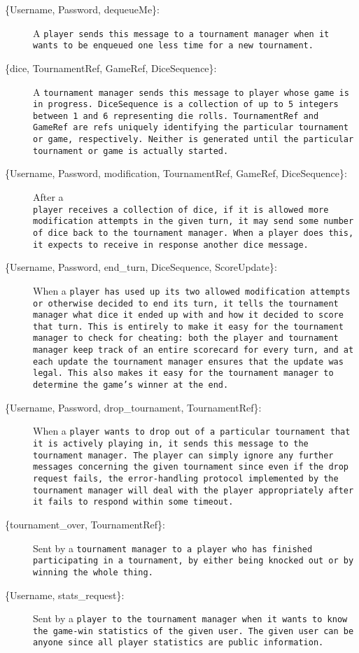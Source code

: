 \documentclass[12pt,letterpaper]{article}
\newcommand{\tm}{\tt{tournament manager}}
\newcommand{\pl}{\tt{player}}
\begin{document}
\begin{description}
\item[\{Username, Password, dequeueMe\}:] A \pl{} sends this message to a \tm{} when it wants to be enqueued one less time for a new tournament.

\item[\{dice, TournamentRef, GameRef, DiceSequence\}:] A \tm{} sends this message to \pl{} whose game is in progress.  \tt{DiceSequence} is a collection of up to 5 integers between 1 and 6 representing die rolls.  \tt{TournamentRef} and \tt{GameRef} are \tt{ref}s uniquely identifying the particular tournament or game, respectively.  Neither is generated until the particular tournament or game is actually started.

\item[\{Username, Password, modification, TournamentRef, GameRef, DiceSequence\}:] After a\\ \pl{} receives a collection of dice, if it is allowed more modification attempts in the given turn, it may send some number of dice back to the \tm.  When a \pl{} does this, it expects to receive in response another \tt{dice} message.

\item[\{Username, Password, end\_turn, DiceSequence, ScoreUpdate\}:] When a \pl{} has used up its two allowed modification attempts or otherwise decided to end its turn, it tells the \tm{} what dice it ended up with and how it decided to score that turn.  This is entirely to make it easy for the \tm{} to check for cheating: both the \pl{} and \tm{} keep track of an entire scorecard for every turn, and at each update the \tm{} ensures that the update was legal.  This also makes it easy for the \tm{} to determine the game's winner at the end.

\item[\{Username, Password, drop\_tournament, TournamentRef\}:] When a \pl{} wants to drop out of a particular tournament that it is actively playing in, it sends this message to the \tm.  The \pl{} can simply ignore any further messages concerning the given tournament since even if the \tt{drop} request fails, the error-handling protocol implemented by the \tm{} will deal with the player appropriately after it fails to respond within some timeout.

\item[\{tournament\_over, TournamentRef\}:] Sent by a \tm{} to a \pl{} who has finished participating in a tournament, by either being knocked out or by winning the whole thing.

\item[\{Username, stats\_request\}:] Sent by a \pl{} to the \tm{} when it wants to know the game-win statistics of the given user.  The given user can be anyone since all player statistics are public information.


\end{description}
\end{document}
